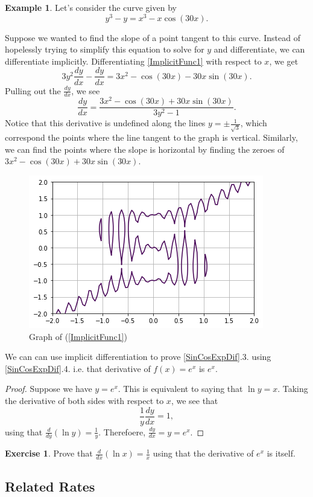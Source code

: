 \documentclass[12pt]{article}
\newcommand{\diff}[2]{\frac{d #1}{d #2} }
\theoremstyle{definition}
\newtheorem{exmp}[thm]{Example}
\newtheorem{exer}[thm]{Exercise}
\theoremstyle{plain}
\numberwithin{equation}{section}
\begin{document}
\begin{exmp}
  Let's consider the curve given by
\begin{equation}\label{ImplicitFunc1}
  y^3-y = x^3-x\cos(30x).
\end{equation}

Suppose we wanted to find the slope of a point tangent to this curve. Instead of hopelessly trying to simplify this equation to solve for $y$ and differentiate, we can differentiate implicitly. Differentiating \eqref{ImplicitFunc1} with respect to $x$, we get \[
3y^2\diff{y}{x}-\diff{y}{x}=3x^2-\cos(30x)-30x\sin(30x).
\]
Pulling out the $\diff{y}{x}$, we see
\[
\diff{y}{x}=\frac{3x^2-\cos(30x)+30x\sin(30x)}{3y^2-1}.
\]
Notice that this derivative is undefined along the lines $y=\pm\frac{1}{\sqrt{3}}$, which correspond the points where the line tangent to the graph is vertical. Similarly, we can find the points where the slope is horizontal by finding the zeroes of $3x^2-\cos(30x)+30x\sin(30x)$.


\begin{figure}
  \centering
  \includegraphics[width=0.4\linewidth]{ImplicitFunc1.png}
  \caption{Graph of (\ref{ImplicitFunc1})}
\end{figure}
\end{exmp}

We can can use implicit differentiation to prove \cref{SinCosExpDif}.3. using \cref{SinCosExpDif}.4.  i.e. that derivative of $f(x)=e^x$ is $e^x$.
\begin{proof}
Suppose we have $y=e^x$. This is equivalent to saying that $\ln y = x$.
Taking the derivative of both sides with respect to $x$, we see that
\[
\frac{1}{y}\diff{y}{x}=1,
\]
using that $\diff{}{y}\left( \ln y \right) = \frac{1}{y}$. Therefoere,
$\diff{y}{x}=y=e^x$.
\end{proof}

\begin{exer}
  Prove that $\diff{}{x}\left( \ln x \right) = \frac{1}{x}$ using that the derivative of $e^x$ is itself.
\end{exer}

\subsection{Related Rates}
\end{document}
